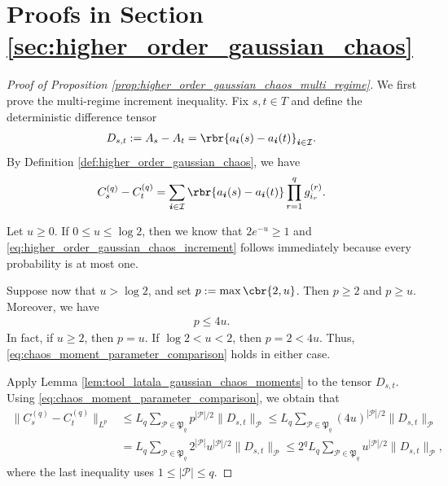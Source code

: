 \documentclass[11pt]{article}
\begin{document}
\section{Proofs in Section \ref{sec:higher_order_gaussian_chaos}}
\label{app:proofs_higher_order_gaussian_chaos}

\begin{proof}[Proof of Proposition
\ref{prop:higher_order_gaussian_chaos_multi_regime}]
We first prove the multi-regime increment inequality. Fix $s,t\in T$
and define the deterministic difference tensor
\begin{align*}
D_{s,t}
:=
A_s-A_t
=
\rbr{
a_{\boldsymbol i}(s)-a_{\boldsymbol i}(t)
}_{\boldsymbol i\in\mathcal I}.
\end{align*}
By Definition \ref{def:higher_order_gaussian_chaos}, we have
\begin{align}
C_s^{(q)}-C_t^{(q)}
=
\sum_{\boldsymbol i\in\mathcal I}
\rbr{
a_{\boldsymbol i}(s)-a_{\boldsymbol i}(t)
}
\prod_{r=1}^qg^{(r)}_{i_r}.
\label{eq:chaos_increment_representation}
\end{align}

Let $u\ge0$. If $0\le u\le\log2$, then we know that $2e^{-u}
\ge
1$ and \eqref{eq:higher_order_gaussian_chaos_increment} follows
immediately because every probability is at most one.

Suppose now that $u>\log2$, and set $p
:=
\max\cbr{2,u}$. Then $p\ge2$ and $p\ge u$. Moreover, we have
\begin{align}
p\le
4u.
\label{eq:chaos_moment_parameter_comparison}
\end{align}
In fact, if $u\ge2$, then $p=u$. If $\log2<u<2$, then
$p=2<4u$. Thus, \eqref{eq:chaos_moment_parameter_comparison} holds
in either case.

Apply Lemma \ref{lem:tool_latala_gaussian_chaos_moments} to the
tensor $D_{s,t}$. Using
\eqref{eq:chaos_moment_parameter_comparison}, we obtain that
\begin{align*}
\|C_s^{(q)}-C_t^{(q)}\|_{L^p}&\le
L_q
\sum_{\mathcal P\in\mathfrak P_q}
p^{|\mathcal P|/2}\|D_{s,t}\|_{\mathcal P}\le
L_q
\sum_{\mathcal P\in\mathfrak P_q}
(4u)^{|\mathcal P|/2}\|D_{s,t}\|_{\mathcal P}\\
&=
L_q
\sum_{\mathcal P\in\mathfrak P_q}
2^{|\mathcal P|}u^{|\mathcal P|/2}
\|D_{s,t}\|_{\mathcal P}\le
2^qL_q
\sum_{\mathcal P\in\mathfrak P_q}
u^{|\mathcal P|/2}
\|D_{s,t}\|_{\mathcal P},
\end{align*}
where the last inequality uses
$1\le|\mathcal P|\le q$.


\end{proof}
\end{document}
